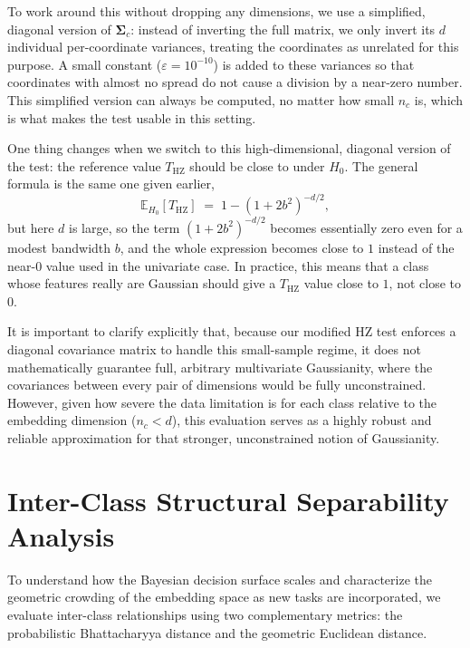 To work around this without dropping any dimensions, we use a simplified, diagonal version of $\boldsymbol{\Sigma}_c$: instead of inverting the full matrix, we only invert its $d$ individual per-coordinate variances, treating the coordinates as unrelated for this purpose. A small constant ($\varepsilon = 10^{-10}$) is added to these variances so that coordinates with almost no spread do not cause a division by a near-zero number. This simplified version can always be computed, no matter how small $n_c$ is, which is what makes the test usable in this setting.

One thing changes when we switch to this high-dimensional, diagonal version of the test: the reference value $T_{\mathrm{HZ}}$ should be close to under $H_0$. The general formula is the same one given earlier,
\begin{equation}
	\mathbb{E}_{H_0}[T_{\mathrm{HZ}}] \;=\; 1 - (1+2b^2)^{-d/2},
\end{equation}
but here $d$ is large, so the term $(1+2b^2)^{-d/2}$ becomes essentially zero even for a modest bandwidth $b$, and the whole expression becomes close to $1$ instead of the near-$0$ value used in the univariate case. In practice, this means that a class whose features really are Gaussian should give a $T_{\mathrm{HZ}}$ value close to $1$, not close to $0$.

It is important to clarify explicitly that, because our modified HZ test enforces a diagonal covariance matrix to handle this small-sample regime, it does not mathematically guarantee full, arbitrary multivariate Gaussianity, where the covariances between every pair of dimensions would be fully unconstrained. However, given how severe the data limitation is for each class relative to the embedding dimension ($n_c < d$), this evaluation serves as a highly robust and reliable approximation for that stronger, unconstrained notion of Gaussianity.

\section{Inter-Class Structural Separability Analysis}
\label{sec:method:separability}

To understand how the Bayesian decision surface scales and characterize the geometric crowding of the embedding space as new tasks are incorporated, we evaluate inter-class relationships using two complementary metrics: the probabilistic Bhattacharyya distance and the geometric Euclidean distance.

